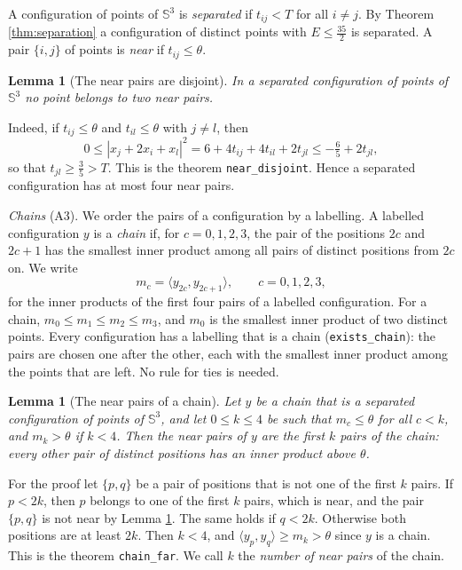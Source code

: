 \documentclass[reqno,a4paper,11pt]{amsart}
\numberwithin{equation}{section}
\newtheorem{lemma}[theorem]{Lemma}
\newcommand{\Sph}{\mathbb{S}}
\newcommand{\lean}[1]{\texttt{#1}}
\begin{document}
A configuration of points of $\Sph^3$ is \emph{separated} if $t_{ij} < T$ for all $i \neq j$. By Theorem \ref{thm:separation} a configuration of distinct points with $E \leq \tfrac{35}{2}$ is separated. A pair $\{i, j\}$ of points is \emph{near} if $t_{ij} \leq \theta$.

\begin{lemma}[The near pairs are disjoint]\label{lma:matching}
In a separated configuration of points of $\Sph^3$ no point belongs to two near pairs.
\end{lemma}

Indeed, if $t_{ij} \leq \theta$ and $t_{il} \leq \theta$ with $j \neq l$, then
$$
0 \leq |x_j + 2 x_i + x_l|^2 = 6 + 4 t_{ij} + 4 t_{il} + 2 t_{jl} \leq -\tfrac{6}{5} + 2 t_{jl},
$$
so that $t_{jl} \geq \tfrac35 > T$. This is the theorem \lean{near\_disjoint}. Hence a separated configuration has at most four near pairs.

\emph{Chains} (A3). We order the pairs of a configuration by a labelling. A labelled configuration $y$ is a \emph{chain} if, for $c = 0, 1, 2, 3$, the pair of the positions $2c$ and $2c + 1$ has the smallest inner product among all pairs of distinct positions from $2c$ on. We write
$$
m_c = \langle y_{2c}, y_{2c+1} \rangle, \qquad c = 0, 1, 2, 3,
$$
for the inner products of the first four pairs of a labelled configuration. For a chain, $m_0 \leq m_1 \leq m_2 \leq m_3$, and $m_0$ is the smallest inner product of two distinct points. Every configuration has a labelling that is a chain (\lean{exists\_chain}): the pairs are chosen one after the other, each with the smallest inner product among the points that are left. No rule for ties is needed.

\begin{lemma}[The near pairs of a chain]\label{lma:kchar}
Let $y$ be a chain that is a separated configuration of points of $\Sph^3$, and let $0 \leq k \leq 4$ be such that $m_c \leq \theta$ for all $c < k$, and $m_k > \theta$ if $k < 4$. Then the near pairs of $y$ are the first $k$ pairs of the chain: every other pair of distinct positions has an inner product above $\theta$.
\end{lemma}

For the proof let $\{p, q\}$ be a pair of positions that is not one of the first $k$ pairs. If $p < 2k$, then $p$ belongs to one of the first $k$ pairs, which is near, and the pair $\{p, q\}$ is not near by Lemma \ref{lma:matching}. The same holds if $q < 2k$. Otherwise both positions are at least $2k$. Then $k < 4$, and $\langle y_p, y_q \rangle \geq m_k > \theta$ since $y$ is a chain. This is the theorem \lean{chain\_far}. We call $k$ the \emph{number of near pairs} of the chain.
\end{document}
